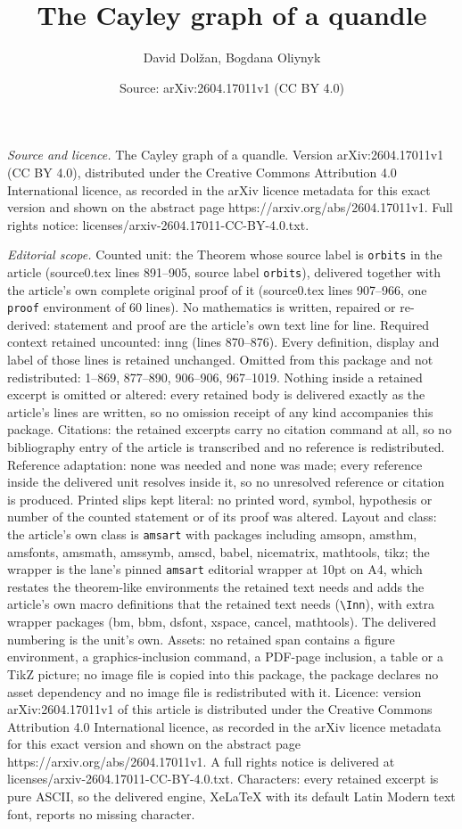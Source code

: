 \documentclass[10pt,a4paper]{amsart}
\title[The Cayley graph of a quandle]{The Cayley graph of a quandle}
\author{David Dol\v{z}an, Bogdana Oliynyk}
\date{Source: arXiv:2604.17011v1 (CC BY 4.0)}
\begin{document}
\maketitle

\noindent\emph{Source and licence.} The Cayley graph of a quandle. Version arXiv:2604.17011v1 (CC BY 4.0), distributed under the Creative Commons Attribution 4.0 International licence, as recorded in the arXiv licence metadata for this exact version and shown on the abstract page https://arxiv.org/abs/2604.17011v1. Full rights notice: licenses/arxiv-2604.17011-CC-BY-4.0.txt.\par\smallskip

\noindent\textit{Editorial scope.} Counted unit: the Theorem whose source label is \texttt{orbits} in the article (source0.tex lines 891--905, source label \texttt{orbits}), delivered together with the article's own complete original proof of it (source0.tex lines 907--966, one \texttt{proof} environment of 60 lines). No mathematics is written, repaired or re-derived: statement and proof are the article's own text line for line. Required context retained uncounted: inng (lines 870--876). Every definition, display and label of those lines is retained unchanged. Omitted from this package and not redistributed: 1--869, 877--890, 906--906, 967--1019. Nothing inside a retained excerpt is omitted or altered: every retained body is delivered exactly as the article's lines are written, so no omission receipt of any kind accompanies this package. Citations: the retained excerpts carry no citation command at all, so no bibliography entry of the article is transcribed and no reference is redistributed. Reference adaptation: none was needed and none was made; every reference inside the delivered unit resolves inside it, so no unresolved reference or citation is produced. Printed slips kept literal: no printed word, symbol, hypothesis or number of the counted statement or of its proof was altered. Layout and class: the article's own class is \texttt{amsart} with packages including amsopn, amsthm, amsfonts, amsmath, amssymb, amscd, babel, nicematrix, mathtools, tikz; the wrapper is the lane's pinned \texttt{amsart} editorial wrapper at 10pt on A4, which restates the theorem-like environments the retained text needs and adds the article's own macro definitions that the retained text needs (\texttt{\textbackslash Inn}), with extra wrapper packages (bm, bbm, dsfont, xspace, cancel, mathtools). The delivered numbering is the unit's own. Assets: no retained span contains a figure environment, a graphics-inclusion command, a PDF-page inclusion, a table or a TikZ picture; no image file is copied into this package, the package declares no asset dependency and no image file is redistributed with it. Licence: version arXiv:2604.17011v1 of this article is distributed under the Creative Commons Attribution 4.0 International licence, as recorded in the arXiv licence metadata for this exact version and shown on the abstract page https://arxiv.org/abs/2604.17011v1. A full rights notice is delivered at licenses/arxiv-2604.17011-CC-BY-4.0.txt. Characters: every retained excerpt is pure ASCII, so the delivered engine, XeLaTeX with its default Latin Modern text font, reports no missing character.
\end{document}
